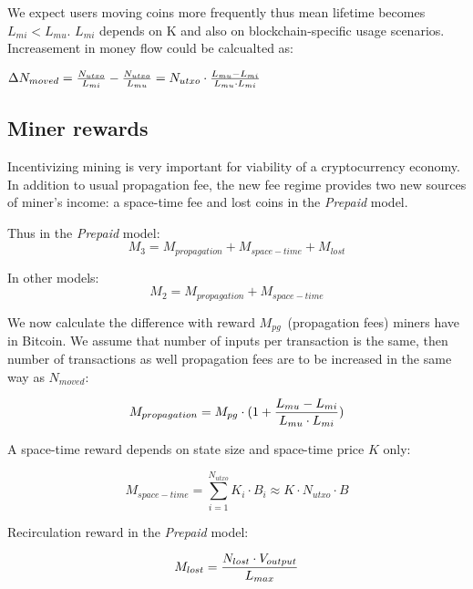\documentclass[]{llncs}   %
\begin{document}
We expect users moving coins more frequently thus mean lifetime becomes $L_{mi} < L_{mu}$. $L_{mi}$ depends on K and also on blockchain-specific usage scenarios. Increasement in money flow could be calcualted as:

$\Delta N_{moved} = {N_{utxo} \over L_{mi}} - {N_{utxo} \over L_{mu}} = N_{utxo} \cdot {{L_{mu}-L_{mi}} \over {L_{mu} \cdot L_{mi}}}$



\subsection{Miner rewards}
\label{minerrew}
Incentivizing mining is very important for viability of a cryptocurrency economy. 
In addition to usual propagation fee, the new fee regime provides two new sources of miner's income: a space-time fee and lost coins in the \textit{Prepaid} model.

Thus in the \textit{Prepaid} model:
\begin{equation}
M_{3} = M_{propagation} + M_{space-time} + M_{lost}
\end{equation}

In other models:
\begin{equation}
M_{2} = M_{propagation} + M_{space-time}
\end{equation}

We now calculate the difference with reward $M_{pg}$~(propagation fees) miners have in Bitcoin. We assume that number of inputs per transaction is the same, then number of transactions as well propagation fees are to be increased in the same way as $N_{moved}$:

\begin{equation}
M_{propagation} = M_{pg} \cdot(1 + {{L_{mu}-L_{mi}} \over {L_{mu} \cdot L_{mi}}})
\end{equation}


A space-time reward depends on state size and space-time price $K$ only:

\begin{equation}
M_{space-time} = \sum_{i=1}^{N_{utxo}} K_i \cdot B_i \approx K \cdot N_{utxo} \cdot B
\end{equation}

Recirculation reward in the \textit{Prepaid} model:

\begin{equation}
M_{lost} = {N_{lost} \cdot V_{output} \over L_{max}}
\end{equation}
\end{document}
